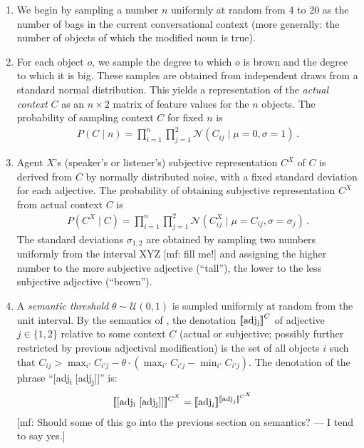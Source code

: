 \documentclass[10pt,a4paper]{article}
\newcommand{\sem}[1]{\mbox{$[\![$#1$]\!]$}}
\newcommand{\den}[1]{\ensuremath{[\![#1]\!]}}
\newcommand{\mf}[1]{\textcolor{BrickRed}{[mf: #1]}}
\begin{document}
\begin{enumerate}
\item We begin by sampling a number $n$ uniformly at random from 4 to 20 as the number of bags in the current conversational context (more generally: the number of objects of which the modified noun is true). 
\item For each object $o$, we sample the degree to which $o$ is brown and the degree to which it is big. These samples are obtained from independent draws from a standard normal distribution. This yields a representation of the \emph{actual context} $C$ as an $n \times 2$ matrix of feature values for the $n$ objects. The probability of sampling context $C$ for fixed $n$ is
  \begin{align*}
  P(C \mid n) = \prod_{i=1}^n \prod_{j=1}^2 \mathcal{N}(C_{ij} \mid \mu = 0, \sigma = 1)\,.
  \end{align*}
\item Agent $X$'s (speaker's or listener's) subjective representation $C^X$ of $C$ is derived from $C$ by normally distributed noise, with a fixed standard deviation for each adjective. The probability of obtaining subjective representation $C^X$ from actual context $C$ is
  \begin{align*}
P(C^X \mid C) = \prod_{i=1}^n \prod_{j=1}^2 \mathcal{N}(C_{ij}^X \mid \mu = C_{ij}, \sigma = \sigma_j)\,.
  \end{align*}
The standard deviations $\sigma_{1,2}$ are obtained by sampling two numbers uniformly from the interval XYZ \mf{fill me!} and assigning the higher number to the more subjective adjective (``tall''), the lower to the less subjective adjective (``brown'').
\item A \emph{semantic threshold} $\theta \sim \mathcal{U}(0,1)$ is sampled uniformly at random from the unit interval. By the semantics of , the denotation $\sem{adj\textsubscript{j}}^{C}$ of adjective $j \in \{1,2\}$ relative to some context $C$ (actual or subjective; possibly further restricted by previous adjectival modification) is the set of all objects $i$ such that $C_{ij} > \max_{i'}C_{i'j} - \theta \cdot (\max_{i'}C_{i'j} - \min_{i'}C_{i'j})$. The denotation of the phrase ``[adj\textsubscript{i} [adj\textsubscript{j}]]'' is:
  \begin{align*}
   \den{\text{[adj\textsubscript{i} [adj\textsubscript{j}]]}}^{C^X} & = \den{\text{adj}_i}^{\den{\text{adj}_j}^{C^X}} 
  \end{align*}
  \mf{Should some of this go into the previous section on semantics? --- I tend to say yes.}

\end{enumerate}
\end{document}
